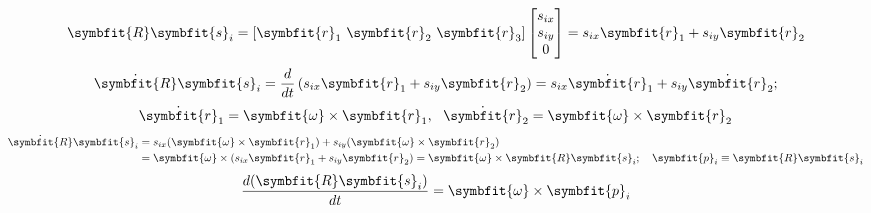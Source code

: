 \documentclass[11pt,a4paper]{article}
\numberwithin{equation}{section}
\newcommand{\vect}[1]{\symbfit{#1}}
\begin{document}
{\begin{minipage}[t]{0.58\textwidth}
\[\]
\[
\vect R\vect s_i = [\vect r_1\ \vect r_2\ \vect r_3]\begin{bmatrix}s_{ix}\\ s_{iy}\\ 0\end{bmatrix} = s_{ix}\vect r_1 + s_{iy}\vect r_2
\]
\[
\dot{\vect R}\vect s_i = \frac{d}{dt}\left(s_{ix}\vect r_1 + s_{iy}\vect r_2\right) = s_{ix}\dot{\vect r}_1 + s_{iy}\dot{\vect r}_2 ;
\]
\[
\dot{\vect r}_1 = \vect\omega\times\vect r_1,\ \ \dot{\vect r}_2 = \vect\omega\times\vect r_2
\]
\[
\begin{aligned}\dot{\vect R}\vect s_i &= s_{ix}(\vect\omega\times\vect r_1) + s_{iy}(\vect\omega\times\vect r_2)\\ &= \vect\omega\times(s_{ix}\vect r_1 + s_{iy}\vect r_2) = \vect\omega\times\vect R\vect s_i ;\quad \vect p_i \equiv \vect R\vect s_i\end{aligned}
\]
\[
\frac{d(\vect R\vect s_i)}{dt} = \vect\omega\times\vect p_i
\]
\end{minipage}}
\end{document}
